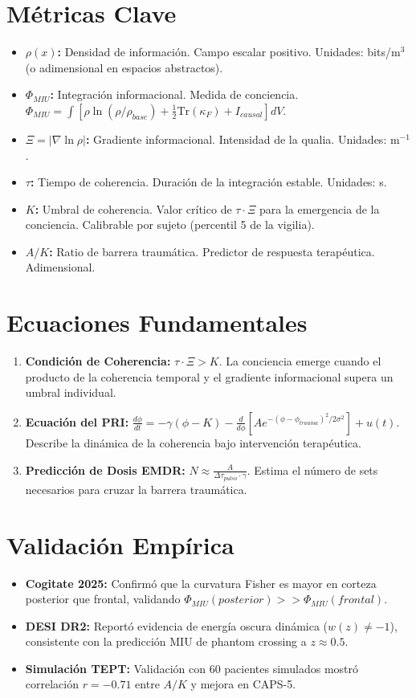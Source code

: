 \documentclass[12pt,a4paper,openany]{book}
\begin{document}
\section{Métricas Clave}
\begin{itemize}
\item \textbf{$\rho(x)$:} Densidad de información. Campo escalar positivo. Unidades: bits/m$^3$ (o adimensional en espacios abstractos).
\item \textbf{$\Phi_{MIU}$:} Integración informacional. Medida de conciencia. $\Phi_{MIU} = \int [\rho \ln(\rho/\rho_{base}) + \frac{1}{2}\text{Tr}(\kappa_F) + I_{causal}] dV$.
\item \textbf{$\Xi = |\nabla \ln \rho|$:} Gradiente informacional. Intensidad de la qualia. Unidades: m$^{-1}$.
\item \textbf{$\tau$:} Tiempo de coherencia. Duración de la integración estable. Unidades: s.
\item \textbf{$K$:} Umbral de coherencia. Valor crítico de $\tau \cdot \Xi$ para la emergencia de la conciencia. Calibrable por sujeto (percentil 5 de la vigilia).
\item \textbf{$A/K$:} Ratio de barrera traumática. Predictor de respuesta terapéutica. Adimensional.
\end{itemize}

\section{Ecuaciones Fundamentales}
\begin{enumerate}
\item \textbf{Condición de Coherencia:} $\tau \cdot \Xi > K$. La conciencia emerge cuando el producto de la coherencia temporal y el gradiente informacional supera un umbral individual.
\item \textbf{Ecuación del PRI:} $\frac{d\phi}{dt} = -\gamma(\phi - K) - \frac{d}{d\phi}[A e^{-(\phi-\phi_{trauma})^2/2\sigma^2}] + u(t)$. Describe la dinámica de la coherencia bajo intervención terapéutica.
\item \textbf{Predicción de Dosis EMDR:} $N \approx \frac{A}{\Delta \tau_{pulso} \cdot \gamma}$. Estima el número de sets necesarios para cruzar la barrera traumática.
\end{enumerate}

\section{Validación Empírica}
\begin{itemize}
\item \textbf{Cogitate 2025:} Confirmó que la curvatura Fisher es mayor en corteza posterior que frontal, validando $\Phi_{MIU}(posterior) >> \Phi_{MIU}(frontal)$.
\item \textbf{DESI DR2:} Reportó evidencia de energía oscura dinámica ($w(z) \neq -1$), consistente con la predicción MIU de phantom crossing a $z \approx 0.5$.
\item \textbf{Simulación TEPT:} Validación con 60 pacientes simulados mostró correlación $r = -0.71$ entre $A/K$ y mejora en CAPS-5.
\end{itemize}
\end{document}
